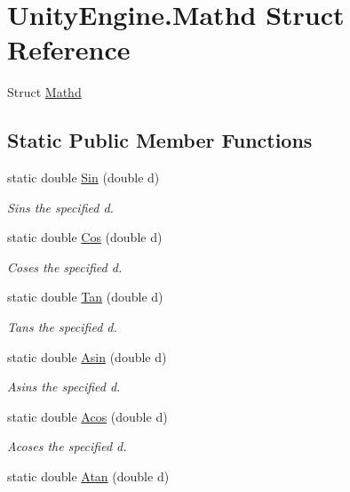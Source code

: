 \hypertarget{struct_unity_engine_1_1_mathd}{}\section{Unity\+Engine.\+Mathd Struct Reference}
\label{struct_unity_engine_1_1_mathd}


Struct \hyperlink{struct_unity_engine_1_1_mathd}{Mathd}  


\subsection*{Static Public Member Functions}
\begin{DoxyCompactItemize}
\item 
static double \hyperlink{struct_unity_engine_1_1_mathd_a0b23cbb04fa0edc5dbaf0f37199999c6}{Sin} (double d)
\begin{DoxyCompactList}\small\item\em Sins the specified d. \end{DoxyCompactList}\item 
static double \hyperlink{struct_unity_engine_1_1_mathd_a3b6033b84f3620261fe0a093a5d634ac}{Cos} (double d)
\begin{DoxyCompactList}\small\item\em Coses the specified d. \end{DoxyCompactList}\item 
static double \hyperlink{struct_unity_engine_1_1_mathd_a7e4f5c67df7117389d40ddaf26bf963a}{Tan} (double d)
\begin{DoxyCompactList}\small\item\em Tans the specified d. \end{DoxyCompactList}\item 
static double \hyperlink{struct_unity_engine_1_1_mathd_aaff3160c6d1a2f5009428539684c7e58}{Asin} (double d)
\begin{DoxyCompactList}\small\item\em Asins the specified d. \end{DoxyCompactList}\item 
static double \hyperlink{struct_unity_engine_1_1_mathd_adf9655c29b2d0dc3c32b5e9ec81648f0}{Acos} (double d)
\begin{DoxyCompactList}\small\item\em Acoses the specified d. \end{DoxyCompactList}\item 
static double \hyperlink{struct_unity_engine_1_1_mathd_a0de7adcaa412bc33e545f449176491a4}{Atan} (double d)

\end{DoxyCompactItemize}
